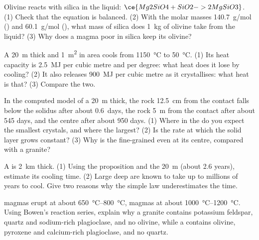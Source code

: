 \begin{exercise}[$\star\star$]\label{exo:g11:igneous-rocks:10}
Olivine reacts with silica in the liquid: $\ce{Mg2SiO4 + SiO2 -> 2
MgSiO3}$. (1) Check that the equation is balanced. (2) With the molar masses
\qty{140.7}{g/mol} () and \qty{60.1}{g/mol} (), what
mass of silica does \qty{1}{kg} of olivine take from the liquid? (3) Why
does a magma poor in silica keep its olivine?
\end{exercise}

\begin{exercise}[$\star\star$]\label{exo:g11:igneous-rocks:11}
A  \qty{20}{m} thick and \qty{1}{m^2} in area cools from
\qty{1150}{\degreeCelsius} to \qty{50}{\degreeCelsius}. (1) Its heat
capacity is \qty{2.5}{MJ} per cubic metre and per degree: what heat does it
lose by cooling? (2) It also releases \qty{900}{MJ} per cubic metre as it
crystallises: what heat is that? (3) Compare the two.
\end{exercise}

\begin{exercise}[$\star\star\star$]\label{exo:g11:igneous-rocks:12}
In the computed model of a  \qty{20}{m} thick, the rock
\qty{12.5}{cm} from the contact falls below the solidus after about
\num{0.6}~days, the rock \qty{5}{m} from the contact after about 545 days,
and the centre after about 950 days. (1) Where in the  do you expect the
smallest crystals, and where the largest? (2) Is the rate at which the
solid layer grows constant? (3) Why is the  fine-grained even at its
centre, compared with a granite?
\end{exercise}

\begin{exercise}[$\star\star\star$]\label{exo:g11:igneous-rocks:13}
A  is \qty{2}{km} thick. (1) Using the proposition and the
\qty{20}{m}  (about 2.6 years), estimate its cooling time. (2) Large
deep  are known to take up to millions of years to cool. Give two
reasons why the simple law underestimates the time.
\end{exercise}

\begin{exercise}[$\star\star\star$]\label{exo:g11:igneous-rocks:14}
 magmas erupt at about \qtyrange{650}{800}{\degreeCelsius}, 
magmas at about \qtyrange{1000}{1200}{\degreeCelsius}. Using Bowen's
reaction series, explain why a granite contains potassium feldspar, quartz
and sodium-rich plagioclase, and no olivine, while a  contains olivine,
pyroxene and calcium-rich plagioclase, and no quartz.
\end{exercise}

